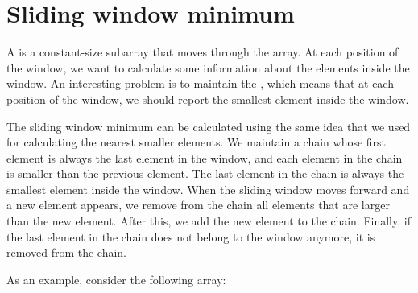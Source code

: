 \section{Sliding window minimum}


A  is a constant-size subarray
that moves through the array.
At each position of the window,
we want to calculate some information
about the elements inside the window.
An interesting problem is to maintain
the ,
which means that at each position of the window,
we should report the smallest element inside the window.

The sliding window minimum can be calculated
using the same idea that we used for calculating
the nearest smaller elements.
We maintain a chain whose
first element is always the last element in the window,
and each element in the chain is smaller than the previous element.
The last element in the chain is always the
smallest element inside the window.
When the sliding window moves forward and
a new element appears, we remove from the chain
all elements that are larger than the new element.
After this, we add the new element to the chain.
Finally, if the last element in the chain
does not belong to the window anymore,
it is removed from the chain.

As an example, consider the following array:

\begin{center}
\end{center}


